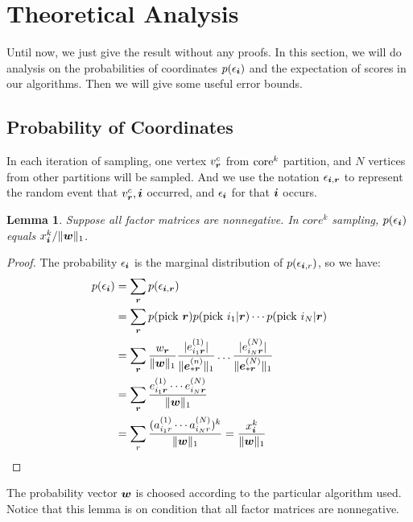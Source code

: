 \documentclass[letterpaper]{article}
\newcommand{\Sca}[3]{{#1}^{(#2)}_{i_#2#3}}%
\newcommand{\anr}[2]{\Sca{a}{#1}{#2}}
\newcommand{\V}[1]{{\bm{{\MakeLowercase{#1}}}}}
\newcommand{\VnC}[3]{\V{#1}^{(#2)}_{#3}}
\newcommand{\norm}[2]{\|#1\|_{#2}}
\newtheorem{lemma}{Lemma}
\begin{document}
\section{Theoretical Analysis}

Until now, we just give the result without any proofs.
In this section,
we will do analysis on the probabilities of coordinates $p(\epsilon_{\V{i}})$
and the expectation of scores in our algorithms.
Then we will give some useful error bounds.

\subsection{Probability of Coordinates}
In each iteration of sampling, one vertex $v^c_{\V{r}}$ from ${\rm core}^k$ partition,
and $N$ vertices from other partitions will be sampled.
And we use the notation $\epsilon_{\V{i},\V{r}}$ to represent the random event
that $v^c_{\V{r}},\V{i}$ occurred,
and $\epsilon_{\V{i}}$ for that $\V{i}$ occurs.

\begin{lemma}\label{lem:Probability}
    Suppose all factor matrices are nonnegative.
    In $core^k$ sampling, $p(\epsilon_{\V{i}})$ equals $x^k_{\V{i}}/\norm{\V{w}}{1}$.
\end{lemma}
\begin{proof}
The probability $\epsilon_{\V{i}}$ is the marginal distribution of $p(\epsilon_{\V{i},r})$,
so we have:
\begin{align*}
p(\epsilon_{\V{i}})
& = \sum_{\V{r}} p(\epsilon_{\V{i},\V{r}}) \\
& = \sum_{\V{r}} p({\rm pick\ }\V{r})p({\rm pick\ }i_1|\V{r})\cdots p({\rm pick\ }i_N|\V{r})\\
& = \sum_{\V{r}} \frac{w_{\V{r}}}{\norm{\V{W}}{1}}
    \frac{|\Sca{e}{1}{\V{r}}|}{\norm{\VnC{e}{n}{*\V{r}}}{1}}\ldots\frac{|\Sca{e}{N}{\V{r}}|}{\norm{\VnC{e}{N}{*\V{r}}}{1}}\\
& = \sum_{\V{r}} \frac{\Sca{e}{1}{\V{r}}\cdots\Sca{e}{N}{\V{r}}}{\norm{\V{W}}{1}}\\
& = \sum_{r}\frac{(\anr{1}{r}\cdots\anr{N}{r})^k}{\norm{\V{W}}{1}}
  = \frac{x^k_{\V{i}}}{\norm{\V{w}}{1}}
\end{align*}
\end{proof}
The probability vector $\V{w}$ is choosed according to the particular algorithm used.
Notice that this lemma is on condition that all factor matrices are nonnegative.
\end{document}
